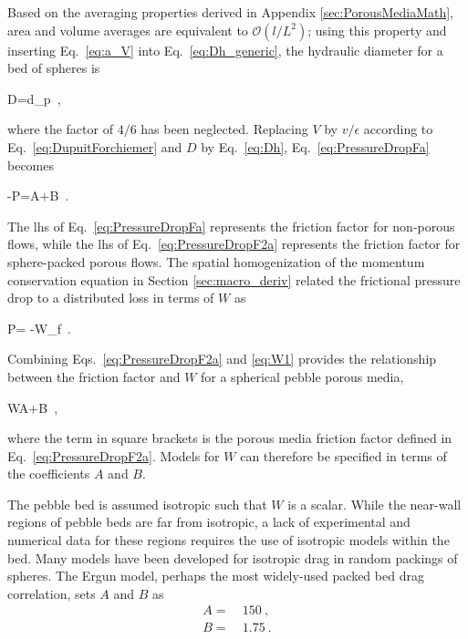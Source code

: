 \noindent Based on the averaging properties derived in Appendix \ref{sec:PorousMediaMath}, area and volume averages are equivalent to \(\mathcal{O}(l/L^2)\); using this property and inserting Eq.\ \eqref{eq:a_V} into Eq.\ \eqref{eq:Dh_generic}, the hydraulic diameter for a bed of spheres is

\beq
\label{eq:Dh}
D=d_p\ ,
\eeq

\noindent where the factor of \(4/6\) has been neglected. Replacing \(V\) by \(v/\epsilon\) according to Eq.\ \eqref{eq:DupuitForchiemer} and \(D\) by Eq.\ \eqref{eq:Dh}, Eq.\ \eqref{eq:PressureDropFa} becomes

\beq
\label{eq:PressureDropF2a}
-\nabla P=A+B\ .
\eeq

\noindent The \gls{lhs} of Eq.\ \eqref{eq:PressureDropFa} represents the friction factor for non-porous flows, while the \gls{lhs} of Eq.\ \eqref{eq:PressureDropF2a} represents the friction factor for sphere-packed porous flows. The spatial homogenization of the momentum conservation equation in Section \ref{sec:macro_deriv} related the frictional pressure drop to a distributed loss in terms of \(W\) as

\beq
\label{eq:W1}
\epsilon\nabla P= -W\rho_f\ .
\eeq

\noindent Combining Eqs.\ \eqref{eq:PressureDropF2a} and \eqref{eq:W1} provides the relationship between the friction factor and \(W\) for a spherical pebble porous media,

\beq
W\equiv \left\lbrack A+B\right\rbrack{}\ ,
\eeq

\noindent where the term in square brackets is the porous media friction factor defined in Eq.\ \eqref{eq:PressureDropF2a}. Models for \(W\) can therefore be specified in terms of the coefficients \(A\) and \(B\).

The pebble bed is assumed isotropic such that \(W\) is a scalar. While the near-wall regions of pebble beds are far from isotropic, a lack of experimental and numerical data for these regions requires the use of isotropic models within the bed. Many models have been developed for isotropic drag in random packings of spheres. The Ergun model, perhaps the most widely-used packed bed drag correlation, sets \(A\) and \(B\) as \cite{ergun}
\begin{subequations}
\label{eq:Ergun}
\begin{align}
A=&\ 150\ ,\\
B=&\ 1.75\ .
\end{align}
\end{subequations}

